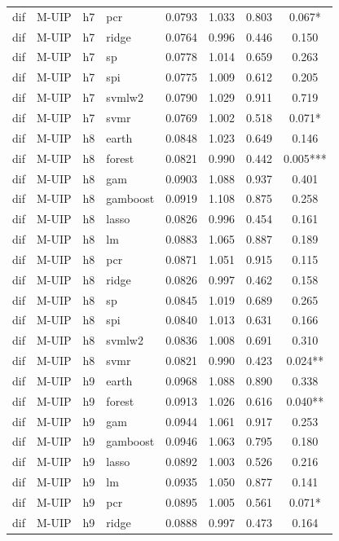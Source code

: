 \begin{ThreePartTable}
\begin{longtable}[t]{llclcccc}
dif & M-UIP & h7 & pcr & 0.0793 & 1.033 & 0.803 & 0.067*\\
dif & M-UIP & h7 & ridge & 0.0764 & 0.996 & 0.446 & 0.150\\
dif & M-UIP & h7 & sp & 0.0778 & 1.014 & 0.659 & 0.263\\
dif & M-UIP & h7 & spi & 0.0775 & 1.009 & 0.612 & 0.205\\
dif & M-UIP & h7 & svmlw2 & 0.0790 & 1.029 & 0.911 & 0.719\\
dif & M-UIP & h7 & svmr & 0.0769 & 1.002 & 0.518 & 0.071*\\
\addlinespace
dif & M-UIP & h8 & earth & 0.0848 & 1.023 & 0.649 & 0.146\\
dif & M-UIP & h8 & forest & 0.0821 & 0.990 & 0.442 & 0.005***\\
dif & M-UIP & h8 & gam & 0.0903 & 1.088 & 0.937 & 0.401\\
dif & M-UIP & h8 & gamboost & 0.0919 & 1.108 & 0.875 & 0.258\\
dif & M-UIP & h8 & lasso & 0.0826 & 0.996 & 0.454 & 0.161\\
dif & M-UIP & h8 & lm & 0.0883 & 1.065 & 0.887 & 0.189\\
dif & M-UIP & h8 & pcr & 0.0871 & 1.051 & 0.915 & 0.115\\
dif & M-UIP & h8 & ridge & 0.0826 & 0.997 & 0.462 & 0.158\\
dif & M-UIP & h8 & sp & 0.0845 & 1.019 & 0.689 & 0.265\\
dif & M-UIP & h8 & spi & 0.0840 & 1.013 & 0.631 & 0.166\\
dif & M-UIP & h8 & svmlw2 & 0.0836 & 1.008 & 0.691 & 0.310\\
dif & M-UIP & h8 & svmr & 0.0821 & 0.990 & 0.423 & 0.024**\\
\addlinespace
dif & M-UIP & h9 & earth & 0.0968 & 1.088 & 0.890 & 0.338\\
dif & M-UIP & h9 & forest & 0.0913 & 1.026 & 0.616 & 0.040**\\
dif & M-UIP & h9 & gam & 0.0944 & 1.061 & 0.917 & 0.253\\
dif & M-UIP & h9 & gamboost & 0.0946 & 1.063 & 0.795 & 0.180\\
dif & M-UIP & h9 & lasso & 0.0892 & 1.003 & 0.526 & 0.216\\
dif & M-UIP & h9 & lm & 0.0935 & 1.050 & 0.877 & 0.141\\
dif & M-UIP & h9 & pcr & 0.0895 & 1.005 & 0.561 & 0.071*\\
dif & M-UIP & h9 & ridge & 0.0888 & 0.997 & 0.473 & 0.164\\

\end{longtable}
\end{ThreePartTable}
